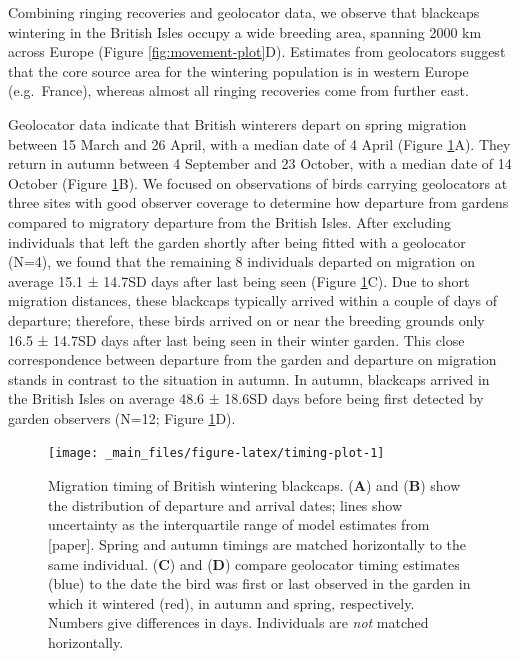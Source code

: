 \documentclass[a4paper, twoside]{templates/ociamthesis}
\begin{document}
Combining ringing recoveries and geolocator data, we observe that blackcaps wintering in the British Isles occupy a wide breeding area, spanning 2000 km across Europe (Figure \ref{fig:movement-plot}D). Estimates from geolocators suggest that the core source area for the wintering population is in western Europe (e.g.~France), whereas almost all ringing recoveries come from further east.

Geolocator data indicate that British winterers depart on spring migration between 15 March and 26 April, with a median date of 4 April (Figure \ref{fig:timing-plot}A). They return in autumn between 4 September and 23 October, with a median date of 14 October (Figure \ref{fig:timing-plot}B). We focused on observations of birds carrying geolocators at three sites with good observer coverage to determine how departure from gardens compared to migratory departure from the British Isles. After excluding individuals that left the garden shortly after being fitted with a geolocator (N=4), we found that the remaining 8 individuals departed on migration on average 15.1 ± 14.7SD days after last being seen (Figure \ref{fig:timing-plot}C). Due to short migration distances, these blackcaps typically arrived within a couple of days of departure; therefore, these birds arrived on or near the breeding grounds only 16.5 ± 14.7SD days after last being seen in their winter garden. This close correspondence between departure from the garden and departure on migration stands in contrast to the situation in autumn. In autumn, blackcaps arrived in the British Isles on average 48.6 ± 18.6SD days before being first detected by garden observers (N=12; Figure \ref{fig:timing-plot}D).



\begin{figure}
\texttt{[image: \_main\_files/figure-latex/timing-plot-1]} \caption{Migration timing of British wintering blackcaps. (\textbf{A}) and (\textbf{B}) show the distribution of departure and arrival dates; lines show uncertainty as the interquartile range of model estimates from {[}paper{]}. Spring and autumn timings are matched horizontally to the same individual. (\textbf{C}) and (\textbf{D}) compare geolocator timing estimates (blue) to the date the bird was first or last observed in the garden in which it wintered (red), in autumn and spring, respectively. Numbers give differences in days. Individuals are \emph{not} matched horizontally.}\label{fig:timing-plot}
\end{figure}
\end{document}
